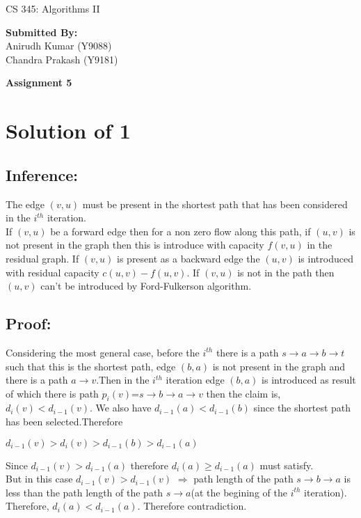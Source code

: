 \documentclass[a4paper,12pt]{article}
\begin{document}
\begin{center}{\Huge CS 345: Algorithms II}\\
\begin{flushright}
\textbf{Submitted By:}\\
Anirudh Kumar (Y9088)\\
Chandra Prakash (Y9181)
\end{flushright}
\LARGE \textbf{Assignment 5}\\
\end{center}

\section{Solution of 1}
\subsection{Inference:}
The edge $(v,u)$ must be present in the shortest path that has been considered in the $i^{th}$ iteration.\\
If $(v,u)$ be a forward edge then for a non zero flow along this path, if $(u,v)$ is not present in the graph then this is introduce with capacity $f(v,u)$ in the residual graph. If $(v,u)$ is present as a backward edge the $(u,v)$ is introduced with residual capacity $c(u,v)-f(u,v)$. If $(v,u)$ is not in the path then $(u,v)$  can't be introduced by Ford-Fulkerson algorithm.
\subsection{Proof:}
Considering the most general case, before the $i^{th}$ there is a path $s\rightarrow a\rightarrow b\rightarrow t$ such that this is the shortest path, edge $(b,a)$ is not present in the graph and there is a path $a\rightarrow v$.Then in the $i^{th}$ iteration edge $(b,a)$ is introduced as result of which there is path $p_i(v)$=$s\rightarrow b\rightarrow a\rightarrow v$ then the claim is, $d_i(v)<d_{i-1}(v)$. We also have $d_{i-1}(a)<d_{i-1}(b)$ since the shortest path has been selected.Therefore
\begin{center}
$d_{i-1}(v)>d_i(v)>d_{i-1}(b)>d_{i-1}(a)$
\end{center}
Since $d_{i-1}(v) > d_{i-1}(a)$ therefore $d_{i}(a)\geq d_{i-1}(a)$ must satisfy.\\
But in this case $d_{i-1}(v) > d_{i-1}(v)$ $\Rightarrow $ path length of the path $s\rightarrow b\rightarrow a$ is less than the path length of the path $s\rightarrow a$(at the begining of the $i^{th}$ iteration). Therefore, $d_i(a)<d_{i-1}(a)$. Therefore contradiction.
\end{document}
